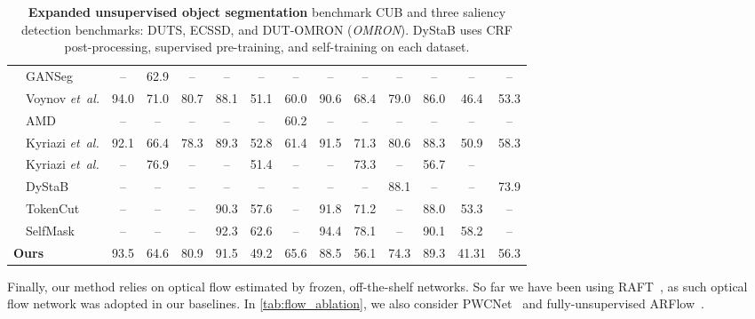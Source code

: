 \begin{table}[t]
\begin{center}
\begin{tabular}{@{}r@{\hspace{2pt}}lccc@{\hspace{10pt}}ccc@{\hspace{10pt}}ccc@{\hspace{10pt}}ccc}
{}\cite{he2021ganseg}               & GANSeg       & --            & 62.9 & -- & -- & -- & -- & -- & -- & -- & -- & -- & -- \\       
{}\cite{voynov2021object}         & Voynov \emph{et~al.}                                                 & 94.0          & 71.0    & 80.7              & 88.1          & 51.1     & 60.0             & 90.6          & 68.4      & 79.0            & 86.0          & 46.4 & 53.3\\
{}\cite{liu2021emergence} & AMD & -- & -- & -- & -- & -- & 60.2 & -- & -- & -- & -- & -- & -- \\
{}\cite{melas-kyriazi2022finding}   & Kyriazi \emph{et~al.}                                            & 92.1          & 66.4      & 78.3            & 89.3          & 52.8      & 61.4            & 91.5 & 71.3    & 80.6     & 88.3          & 50.9 & 58.3\\
{}\cite{melas-kyriazi2022deep}   & Kyriazi \emph{et~al.}                                            & --          & 76.9       & --           & --          & 51.4          & --        & -- & 73.3         & --          & 56.7 & --\\
{}\cite{yang2021dystab} & DyStaB & -- & -- & -- & -- & -- & -- & -- & -- & 88.1 & -- & -- & 73.9 \\
{}\cite{wang2022selfsupervised} & TokenCut    & -- & -- & -- & 90.3 & 57.6 & -- & 91.8 & 71.2 & -- & 88.0 & 53.3 & -- \\
{}\cite{shin2022unsupervised} & SelfMask    & -- & -- & -- & 92.3 & 62.6 & -- & 94.4 & 78.1 & -- & 90.1 & 58.2 & -- \\
\midrule
\multicolumn{2}{l}{ \textbf{Ours}}                                            & 93.5 & 64.6 & 80.9     & 91.5 & 49.2 & 65.6  & 88.5 & 56.1 & 74.3                 & 89.3 & 41.31 & 56.3  \\
\bottomrule
\end{tabular}
\end{center}
\caption{\textbf{Expanded unsupervised object segmentation} benchmark CUB and three saliency detection benchmarks: DUTS, ECSSD, and DUT-OMRON (\textit{OMRON}).  DyStaB uses CRF post-processing, supervised pre-training, and self-training on each dataset.}
\label{table:unsup_semseg_expanded}
\end{table} 
Finally, our method relies on optical flow estimated by frozen, off-the-shelf networks.
So far we have been using RAFT~\cite{teed2020raft}, as such optical flow network was adopted in our baselines.
In \cref{tab:flow_ablation}, we also consider PWCNet~\cite{sun2018pwcnet} and fully-unsupervised ARFlow~\cite{liu2020learning}.
